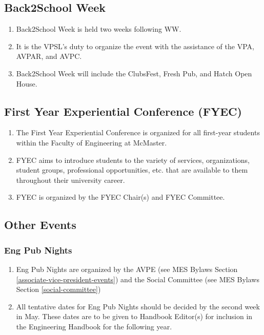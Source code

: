 \subsection{Back2School Week}
\label{back2school-week}
\begin{enumerate}
 \item
  Back2School Week is held two weeks following WW.
 \item
  It is the VPSL's duty to organize the event with the assistance of the VPA, AVPAR, and AVPC.
 \item
  Back2School Week will include the ClubsFest, Fresh Pub, and Hatch Open House.
\end{enumerate}

\subsection{First Year Experiential Conference
 (FYEC)}
\label{first-year-experiential-conference-fyec}
\begin{enumerate}
 \item
  The First Year Experiential Conference is organized for all first-year students within the Faculty of Engineering at McMaster.
 \item
  FYEC aims to introduce students to the variety of services, organizations, student groups, professional opportunities, etc. that are available to them throughout their university career.
 \item
  FYEC is organized by the FYEC Chair(s) and FYEC Committee.

\end{enumerate}

\subsection{Other Events}
\label{other-events}

\subsubsection{Eng Pub Nights}
\label{eng-pub-nights}
\begin{enumerate}
 \item
  Eng Pub Nights are organized by the AVPE (see MES Bylaws Section \ref{associate-vice-president-events}) and the Social Committee (see MES Bylaws Section \ref{social-committee})
 \item
  All tentative dates for Eng Pub Nights should be decided by the second week in May. These dates are to be given to Handbook Editor(s) for inclusion in the Engineering Handbook for the following year.
\end{enumerate}

